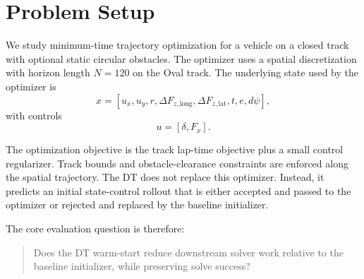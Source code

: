 \section{Problem Setup}

We study minimum-time trajectory optimization for a vehicle on a closed track with optional static circular obstacles. The optimizer uses a spatial discretization with horizon length $N=120$ on the Oval track. The underlying state used by the optimizer is
\[
x = [u_x, u_y, r, \Delta F_{z,\mathrm{long}}, \Delta F_{z,\mathrm{lat}}, t, e, d\psi],
\]
with controls
\[
u = [\delta, F_x].
\]

The optimization objective is the track lap-time objective plus a small control regularizer. Track bounds and obstacle-clearance constraints are enforced along the spatial trajectory. The DT does not replace this optimizer. Instead, it predicts an initial state-control rollout that is either accepted and passed to the optimizer or rejected and replaced by the baseline initializer.

The core evaluation question is therefore:
\begin{quote}
Does the DT warm-start reduce downstream solver work relative to the baseline initializer, while preserving solve success?
\end{quote}
